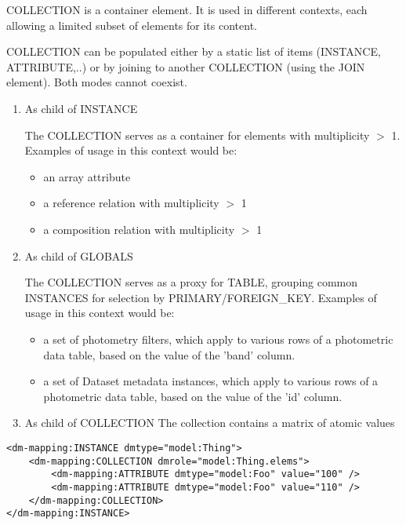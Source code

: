     COLLECTION is a container element.  It is used in different contexts, each allowing a limited subset of elements for its content. 
    
    COLLECTION can be populated either by a static list of items (INSTANCE, ATTRIBUTE,..) or by joining to another COLLECTION (using the JOIN element). Both  modes cannot coexist.
    
    \begin{enumerate}
    \item{As child of INSTANCE}
      
      The COLLECTION serves as a container for elements with multiplicity $>$ 1.\\
      Examples of usage in this context would be:
      \begin{itemize}
        \item an array attribute
        \item a reference relation with multiplicity $>$ 1
        \item a composition relation with multiplicity $>$ 1
      \end{itemize}
      
    \item{As child of GLOBALS}
          
      The COLLECTION serves as a proxy for TABLE, grouping common INSTANCES for selection by PRIMARY/FOREIGN\_KEY.
      Examples of usage in this context would be:
      \begin{itemize}
        \item a set of photometry filters, which apply to various rows of a photometric data table, based on the value of the 'band' column.
        \item a set of Dataset metadata instances, which apply to various rows of a photometric data table, based on the value of the 'id' column.
      \end{itemize}
          
    \item{As child of COLLECTION}
	The collection contains a matrix of  atomic values
        
    \end{enumerate}
   
\begin{lstlisting}[frame=single,caption={Example of COLLECTION child of INSTANCE},style=XML,basicstyle=\tiny]
<dm-mapping:INSTANCE dmtype="model:Thing">
    <dm-mapping:COLLECTION dmrole="model:Thing.elems">
        <dm-mapping:ATTRIBUTE dmtype="model:Foo" value="100" />
        <dm-mapping:ATTRIBUTE dmtype="model:Foo" value="110" />
    </dm-mapping:COLLECTION>
</dm-mapping:INSTANCE>
\end{lstlisting}   

